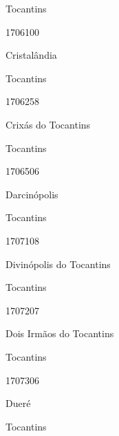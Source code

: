 \documentclass[
  letterpaper,
]{report}
\begin{document}
\n    

\n    

\n      

Tocantins

\n      

1706100

\n      

Cristalândia

\n    

\n    

\n      

Tocantins

\n      

1706258

\n      

Crixás do Tocantins

\n    

\n    

\n      

Tocantins

\n      

1706506

\n      

Darcinópolis

\n    

\n    

\n      

Tocantins

\n      

1707108

\n      

Divinópolis do Tocantins

\n    

\n    

\n      

Tocantins

\n      

1707207

\n      

Dois Irmãos do Tocantins

\n    

\n    

\n      

Tocantins

\n      

1707306

\n      

Dueré

\n    

\n    

\n      

Tocantins
\end{document}
